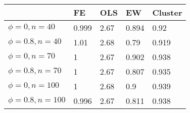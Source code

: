 \begin{tabular}{lllll}
& FE & OLS & EW & Cluster \\ 
\hline 
$\phi=0,n=40$ & 0.999 & 2.67 & 0.894 & 0.92 \\ 
$\phi=0.8,n=40$ & 1.01 & 2.68 & 0.79 & 0.919 \\ 
$\phi=0,n=70$ & 1 & 2.67 & 0.902 & 0.938 \\ 
$\phi=0.8,n=70$ & 1 & 2.67 & 0.807 & 0.935 \\ 
$\phi=0,n=100$ & 1 & 2.68 & 0.9 & 0.939 \\ 
$\phi=0.8,n=100$ & 0.996 & 2.67 & 0.811 & 0.938 \\ 
\hline 
\end{tabular}